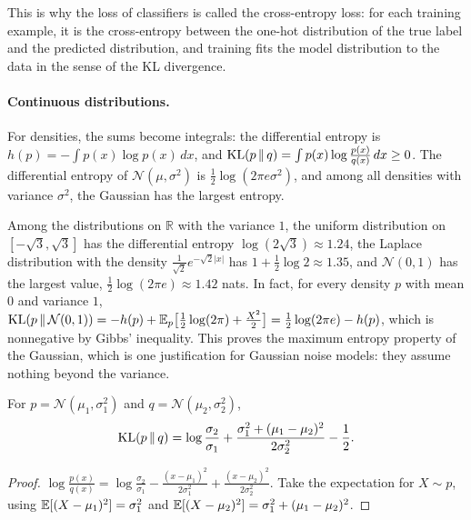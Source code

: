 This is why the loss of classifiers is called the cross-entropy loss: for each training example, it is the cross-entropy between the one-hot distribution of the true label and the predicted distribution, and training fits the model distribution to the data in the sense of the KL divergence.

\paragraph{Continuous distributions.} For densities, the sums become integrals: the differential entropy is $h(p) = -\int p(x)\log p(x)\, dx$, and $\operatorname{KL}(p \,\|\, q) = \int p(x)\log\frac{p(x)}{q(x)}\, dx \geq 0$. The differential entropy of $\mathcal{N}(\mu, \sigma^2)$ is $\frac{1}{2}\log(2\pi e\sigma^2)$, and among all densities with variance $\sigma^2$, the Gaussian has the largest entropy.

\begin{example}\label{L4-ex:max-entropy}
    Among the distributions on $\mathbb{R}$ with the variance $1$, the uniform distribution on $[-\sqrt{3}, \sqrt{3}]$ has the differential entropy $\log(2\sqrt{3}) \approx 1.24$, the Laplace distribution with the density $\frac{1}{\sqrt{2}}e^{-\sqrt{2}|x|}$ has $1 + \frac{1}{2}\log 2 \approx 1.35$, and $\mathcal{N}(0, 1)$ has the largest value, $\frac{1}{2}\log(2\pi e) \approx 1.42$ nats. In fact, for every density $p$ with mean $0$ and variance $1$, $\operatorname{KL}(p \,\|\, \mathcal{N}(0, 1)) = -h(p) + \mathbb{E}_p\big[\frac{1}{2}\log(2\pi) + \frac{X^2}{2}\big] = \frac{1}{2}\log(2\pi e) - h(p)$, which is nonnegative by Gibbs' inequality. This proves the maximum entropy property of the Gaussian, which is one justification for Gaussian noise models: they assume nothing beyond the variance.
\end{example}

\begin{proposition}\label{L4-prop:kl-gaussian}
    For $p = \mathcal{N}(\mu_1, \sigma_1^2)$ and $q = \mathcal{N}(\mu_2, \sigma_2^2)$,
    \[\operatorname{KL}(p \,\|\, q) = \log\frac{\sigma_2}{\sigma_1} + \frac{\sigma_1^2 + (\mu_1 - \mu_2)^2}{2\sigma_2^2} - \frac{1}{2}.\]
\end{proposition}

\begin{proof}
    $\log\frac{p(x)}{q(x)} = \log\frac{\sigma_2}{\sigma_1} - \frac{(x - \mu_1)^2}{2\sigma_1^2} + \frac{(x - \mu_2)^2}{2\sigma_2^2}$. Take the expectation for $X \sim p$, using $\mathbb{E}[(X - \mu_1)^2] = \sigma_1^2$ and $\mathbb{E}[(X - \mu_2)^2] = \sigma_1^2 + (\mu_1 - \mu_2)^2$.
\end{proof}

